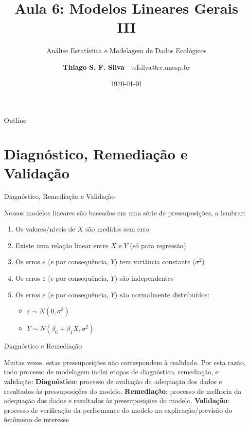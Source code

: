 \documentclass{beamer}\usepackage[]{graphicx}\usepackage[]{color}
\title{Aula 6: Modelos Lineares Gerais III}
\subtitle{Análise Estatística e Modelagem de Dados Ecológicos}
\author{\textbf{Thiago S. F. Silva} - tsfsilva@rc.unesp.br}
\institute{Programa de Pós Graduação em Ecologia e Biodiversidade - UNESP}
\date{\today}
\begin{document}
\begin{frame}[plain] %
  \titlepage
\end{frame}

\begin{frame}{Outline}
  \tableofcontents
\end{frame}

\section{Diagnóstico, Remediação e Validação}

\begin{frame}{Diagnóstico, Remediação e Validação}

Nossos modelos lineares são baseados em uma série de pressuposições, a lembrar:
\vfill
\begin{enumerate}
  \item Os valores/níveis de $X$ são medidos sem erro \pause
  \vfill
  \item Existe uma relação linear entre $X$ e $Y$ (só para regressão) \pause
  \vfill
  \item Os erros $\varepsilon$ (e por consequência, $Y$) tem variância constante ($\sigma^2$) \pause
  \vfill
  \item Os erros $\varepsilon$ (e por consequência, $Y$) são independentes \pause
  \vfill
  \item Os erros $\varepsilon$ (e por consequência, $Y$) são normalmente distribuídos:
  \vfill
  \begin{itemize}
    \item $\varepsilon \sim N(0,\sigma^2)$
    \vfill
    \item  $Y\sim N(\beta _0 + \beta _1 X,\sigma^2)$
  \end{itemize}
\end{enumerate}


\end{frame}

\begin{frame}{Diagnóstico e Remediação}

Muitas vezes, estas pressuposições não correspondem à realidade. Por esta razão, todo processo de modelagem inclui etapas de diagnóstico, remediação, e validação: \pause
\vfill
\textbf{Diagnóstico}: processo de avaliação da adequação dos dados e resultados às pressuposições do modelo. \pause
\vfill
\textbf{Remediação}: processo de melhoria da adequação dos dados e resultados às pressuposições do modelo. \pause
\vfill
\textbf{Validação}: processo de verificação da performance do modelo na explicação/previsão do fenômeno de interesse

\end{frame}
\end{document}
